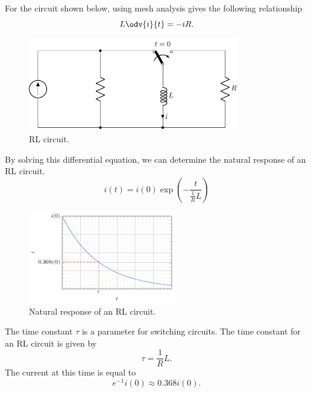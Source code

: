 \documentclass{article}
\begin{document}
\begin{definition}
    For the circuit shown below, using mesh analysis gives the following relationship
    \begin{equation*}
        L \odv{i}{t} = -iR.
    \end{equation*}
    \begin{figure}[H]
        \centering
        \includegraphics[height = 4cm, keepaspectratio = true]{figures/rl_natural.pdf}
        \caption{RL circuit.}
    \end{figure}
    By solving this differential equation, we can determine the natural response of an
    RL circuit.
    \begin{equation*}
        i(t) = i(0)\exp{\left( -\frac{t}{\frac{1}{R}L} \right)}
    \end{equation*}
    \begin{figure}[H]
        \centering
        \includegraphics[height = 4cm, keepaspectratio = true]{figures/rl_natural_plot.pdf}
        \caption{Natural response of an RL circuit.}
    \end{figure}
\end{definition}
\begin{definition}
    The time constant \(\tau\) is a parameter for switching circuits. The time constant for an RL circuit is given by
    \begin{equation*}
        \tau = \frac{1}{R}L.
    \end{equation*}
    The current at this time is equal to
    \begin{equation*}
        e^{-1}i(0) \approx 0.368i(0).
    \end{equation*}
\end{definition}
\end{document}
